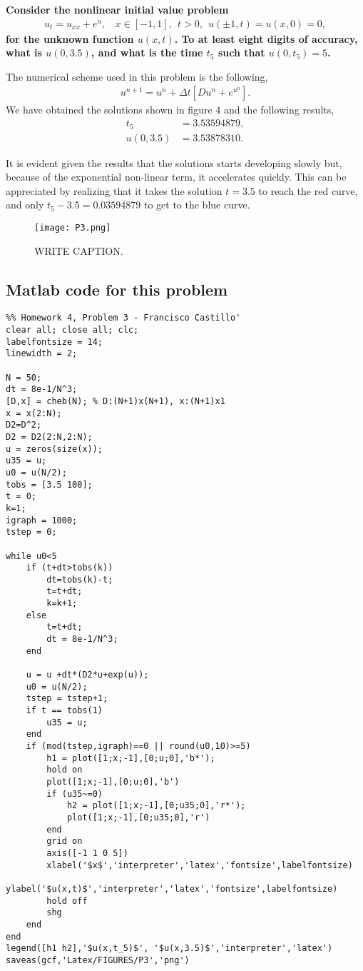 \textbf{Consider the nonlinear initial value problem
\begin{align*}
u_t=u_{xx}+e^u,~~~~x\in [-1,1],~~t>0,~~u(\pm 1,t)=u(x,0)=0,
\end{align*}
for the unknown function $u(x,t)$. To at least eight digits of accuracy, what is $u(0,3.5)$, and what is the time $t_5$ such that $u(0,t_5)=5$.
}
\newline

The numerical scheme used in this problem is the following,
\begin{align*}
u^{n+1}=u^{n}+\Delta t\left[Du^{n}+e^{u^{n}}\right].
\end{align*}
We have obtained the solutions shown in figure 4 and the following results,
\begin{align*}
t_5&=3.53594879,\\
u(0,3.5)&=3.53878310.
\end{align*}

It is evident given the results that the solutions starts developing slowly but, because of the exponential non-linear term, it accelerates quickly. This can be appreciated by realizing that it takes the solution $t=3.5$ to reach the red curve, and only $t_5-3.5 = 0.03594879$ to get to the blue curve.

\begin{figure}[H]
\centering
\texttt{[image: P3.png]}\caption{WRITE CAPTION.}
\end{figure}

\subsection*{Matlab code for this problem}
\begin{verbatim}
%% Homework 4, Problem 3 - Francisco Castillo'
clear all; close all; clc;
labelfontsize = 14;
linewidth = 2;

N = 50;
dt = 8e-1/N^3;
[D,x] = cheb(N); % D:(N+1)x(N+1), x:(N+1)x1
x = x(2:N);
D2=D^2;
D2 = D2(2:N,2:N);
u = zeros(size(x));
u35 = u;
u0 = u(N/2);
tobs = [3.5 100];
t = 0;
k=1;
igraph = 1000;
tstep = 0;

while u0<5
    if (t+dt>tobs(k))
        dt=tobs(k)-t;
        t=t+dt;
        k=k+1;
    else
        t=t+dt;
        dt = 8e-1/N^3;
    end

    u = u +dt*(D2*u+exp(u));
    u0 = u(N/2);
    tstep = tstep+1;
    if t == tobs(1)
        u35 = u;
    end
    if (mod(tstep,igraph)==0 || round(u0,10)>=5)
        h1 = plot([1;x;-1],[0;u;0],'b*');
        hold on
        plot([1;x;-1],[0;u;0],'b')
        if (u35~=0)
            h2 = plot([1;x;-1],[0;u35;0],'r*');
            plot([1;x;-1],[0;u35;0],'r')
        end
        grid on
        axis([-1 1 0 5])
        xlabel('$x$','interpreter','latex','fontsize',labelfontsize)
        ylabel('$u(x,t)$','interpreter','latex','fontsize',labelfontsize)
        hold off
        shg
    end
end
legend([h1 h2],'$u(x,t_5)$', '$u(x,3.5)$','interpreter','latex')
saveas(gcf,'Latex/FIGURES/P3','png')
\end{verbatim}